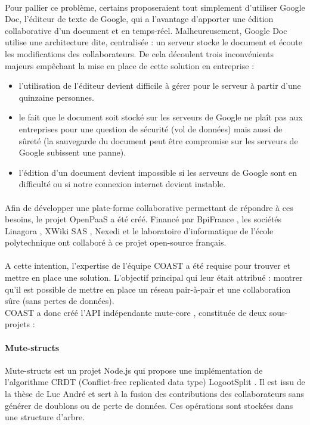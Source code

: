 \documentclass[12pt]{article}
\begin{document}
\paragraph{}
Pour pallier ce problème, certains proposeraient tout simplement d'utiliser Google Doc, l'éditeur de texte de Google, qui a l'avantage d'apporter une édition collaborative d'un document et en temps-réel. Malheureusement, Google Doc utilise une architecture dite, centralisée : un serveur stocke le document et écoute les modifications des collaborateurs. De cela découlent trois inconvénients majeurs empêchant la mise en place de cette solution en entreprise :\\
\begin{itemize}
    \item l'utilisation de l'éditeur devient difficile à gérer pour le serveur à partir d'une quinzaine personnes.
    \item le fait que le document soit stocké sur les serveurs de Google ne plaît pas aux entreprises pour une question de sécurité (vol de données) mais aussi de sûreté (la sauvegarde du document peut être compromise sur les serveurs de Google subissent une panne).
    \item l'édition d'un document devient impossible si les serveurs de Google sont en difficulté ou si notre connexion internet devient instable.
\end{itemize}
\paragraph{}
Afin de développer une plate-forme collaborative permettant de répondre à ces besoins, le projet OpenPaaS \cite{openpaas} a été créé. Financé par BpiFrance \cite{bpi}, les sociétés Linagora \cite{linagora}, XWiki SAS \cite{xwiki}, Nexedi \cite{nexedi} et le laboratoire d'informatique de l'école polytechnique ont collaboré à ce projet open-source français.
\paragraph{}
A cette intention, l'expertise de l'équipe COAST a été requise pour trouver et mettre en place une solution. L'objectif principal qui leur était attribué : montrer qu'il est possible de mettre en place un réseau pair-à-pair et une collaboration sûre (sans pertes de données).\\
COAST a donc créé l'API indépendante mute-core \cite{mute-core}, constituée de deux sous-projets :

\paragraph{Mute-structs}
Mute-structs \cite{mute-structs} est un projet Node.js qui propose une implémentation de l'algorithme CRDT (Conflict-free replicated data type) LogootSplit \cite{logoot}. Il est issu de la thèse de Luc André et sert à la fusion des contributions des collaborateurs sans générer de doublons ou de perte de données. Ces opérations sont stockées dans une structure d'arbre.
\end{document}
